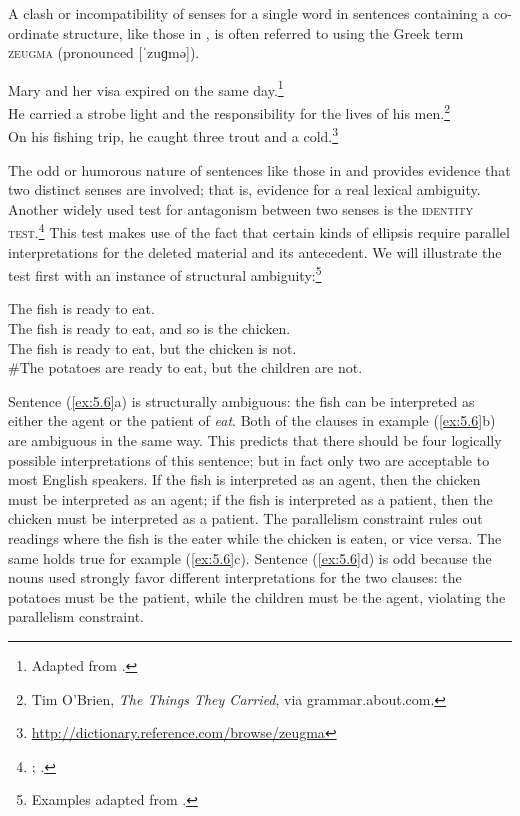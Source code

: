 A clash or incompatibility of senses for a single word in sentences containing a co-ordinate structure, like those in , is often referred to using the  {Greek} term \textsc{zeugma} (pronounced [ˈzuɡmə]).



\ea \label{ex:5.5}
\ea Mary and her visa expired on the same day.\footnote{Adapted from \citet[61]{Cruse1986}.}\\
\ex He carried a strobe light and the responsibility for the lives of his men.\footnote{Tim O’Brien, \textit{The Things They Carried}, via grammar.about.com.}\\
\ex On his fishing trip, he caught three trout and a cold.\footnote{\url{http://dictionary.reference.com/browse/zeugma}}
                       \z
\z


The odd or humorous nature of sentences like those in  and  provides evidence that two distinct senses are involved; that is, evidence for a real lexical ambiguity. Another widely used test for antagonism between two senses is the \textsc{identity test}.\footnote{\citet{Lakoff1970}; \citet{ZwickySadock1975}.} This test makes use of the fact that certain kinds of ellipsis require parallel interpretations for the deleted material and its antecedent. We will illustrate the test first with an instance of structural ambiguity:\footnote{Examples adapted from \citet[512]{Kennedy2011}.}


\ea \label{ex:5.6}
\ea The fish is ready to eat.\\
\ex The fish is ready to eat, and so is the chicken.\\
\ex The fish is ready to eat, but the chicken is not.\\
\ex \#The potatoes are ready to eat, but the children are not.
                       \z
\z


Sentence (\ref{ex:5.6}a) is structurally ambiguous: the fish can be interpreted as either the agent or the patient of \textit{eat}. Both of the clauses in example (\ref{ex:5.6}b) are ambiguous in the same way. This predicts that there should be four logically possible interpretations of this sentence; but in fact only two are acceptable to most English speakers. If the fish is interpreted as an agent, then the chicken must be interpreted as an agent; if the fish is interpreted as a patient, then the chicken must be interpreted as a patient. The parallelism constraint rules out readings where the fish is the eater while the chicken is eaten, or vice versa. The same holds true for example (\ref{ex:5.6}c). Sentence (\ref{ex:5.6}d) is odd because the nouns used strongly favor different interpretations for the two clauses: the potatoes must be the patient, while the children must be the agent, violating the parallelism constraint.



